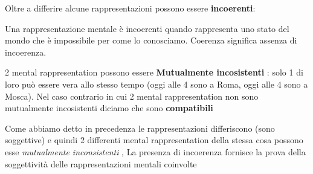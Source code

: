 \documentclass [12pt, letterpaper]{article}
\begin{document}
	
	Oltre a differire alcune rappresentazioni possono essere \textbf{incoerenti}:

	Una rappresentazione mentale è incoerenti quando rappresenta uno stato del mondo che è impossibile per come lo conosciamo. Coerenza significa assenza di incoerenza.
	
	2 mental rappresentation possono essere \textbf{Mutualmente incosistenti} : 
	solo 1 di loro può essere vera allo stesso tempo (oggi alle 4 sono a Roma, oggi alle 4 sono a Mosca). Nel caso contrario in cui 2 mental rappresentation non sono mutualmente incosistenti diciamo che sono \textbf{compatibili}
	
	
	Come abbiamo detto in precedenza le rappresentazioni differiscono (sono soggettive) e quindi 2 differenti mental rappresentation della stessa cosa possono esse \textit{mutualmente inconsistenti} , La presenza di incoerenza fornisce la prova della soggettività
	delle rappresentazioni mentali coinvolte
\end{document}
